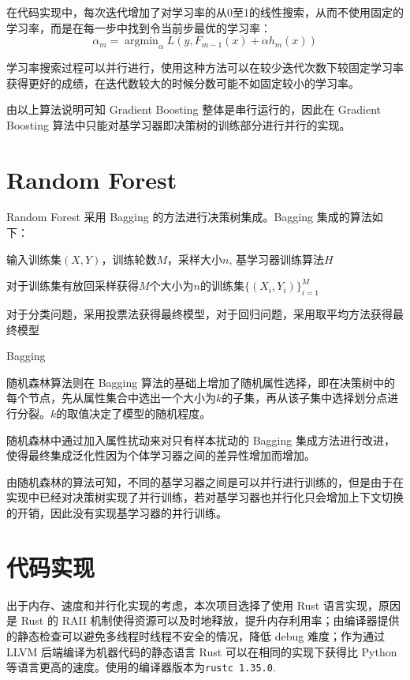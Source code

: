 \documentclass[12pt]{article}
\begin{document}
在代码实现中，每次迭代增加了对学习率的从0至1的线性搜索，从而不使用固定的学习率，而是在每一步中找到令当前步最优的学习率：
\begin{equation}
    \alpha_m = \mathop{\arg\min}_\alpha L(y, F_{m-1}(x)+\alpha h_m(x))
\end{equation}

学习率搜索过程可以并行进行，使用这种方法可以在较少迭代次数下较固定学习率获得更好的成绩，在迭代数较大的时候分数可能不如固定较小的学习率。

由以上算法说明可知 Gradient Boosting 整体是串行运行的，因此在 Gradient Boosting 算法中只能对基学习器即决策树的训练部分进行并行的实现。


\section{Random Forest}

Random Forest 采用 Bagging 的方法进行决策树集成。Bagging 集成的算法如下：

输入训练集$(X, Y)$，训练轮数$M$，采样大小$n$, 基学习器训练算法$H$

对于训练集有放回采样获得$M$个大小为$n$的训练集$\{(X_i, Y_i)\}_{i=1}^M$

\begin{algorithm}[H]
    \SetAlgoLined
    
    对于分类问题，采用投票法获得最终模型，对于回归问题，采用取平均方法获得最终模型\;
    \caption{Bagging}
\end{algorithm}

随机森林算法则在 Bagging 算法的基础上增加了随机属性选择，即在决策树中的每个节点，先从属性集合中选出一个大小为$k$的子集，再从该子集中选择划分点进行分裂。$k$的取值决定了模型的随机程度。

随机森林中通过加入属性扰动来对只有样本扰动的 Bagging 集成方法进行改进，使得最终集成泛化性因为个体学习器之间的差异性增加而增加。

由随机森林的算法可知，不同的基学习器之间是可以并行进行训练的，但是由于在实现中已经对决策树实现了并行训练，若对基学习器也并行化只会增加上下文切换的开销，因此没有实现基学习器的并行训练。

\section{代码实现}

出于内存、速度和并行化实现的考虑，本次项目选择了使用 Rust 语言实现，原因是 Rust 的 RAII 机制使得资源可以及时地释放，提升内存利用率；由编译器提供的静态检查可以避免多线程时线程不安全的情况，降低 debug 难度；作为通过 LLVM 后端编译为机器代码的静态语言 Rust 可以在相同的实现下获得比 Python 等语言更高的速度。使用的编译器版本为\lstinline{rustc 1.35.0}.
\end{document}
